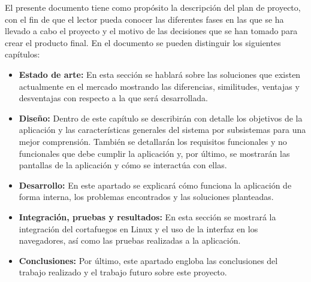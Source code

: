 El presente documento tiene como propósito la descripción del plan de proyecto, con el fin de que el lector pueda conocer las diferentes fases en las que se ha llevado a cabo el proyecto y el motivo de las decisiones que se han tomado para crear el producto final.
En el documento se pueden distinguir los siguientes capítulos:
\begin{itemize}
\item \textbf{Estado de arte:}  En esta sección se hablará sobre las soluciones que existen actualmente en el mercado mostrando las diferencias, similitudes, ventajas y desventajas con respecto a la que será desarrollada.
\item \textbf{Diseño:} Dentro de este capítulo se describirán con detalle los objetivos de la aplicación y las características generales del sistema por subsistemas para una mejor comprensión. También se detallarán los requisitos funcionales y no funcionales que debe cumplir la aplicación y, por último, se mostrarán las pantallas de la aplicación y cómo se interactúa con ellas.
\item \textbf{Desarrollo:} En este apartado se explicará cómo funciona la aplicación de forma interna, los problemas encontrados y las soluciones planteadas.
\item \textbf{Integración, pruebas y resultados: }En esta sección se mostrará la integración del cortafuegos en Linux y el uso de la interfaz en los navegadores, así como las pruebas realizadas a la aplicación.
\item \textbf{Conclusiones: }Por último, este apartado engloba las conclusiones del trabajo realizado y el trabajo futuro sobre este proyecto.
\end{itemize}
